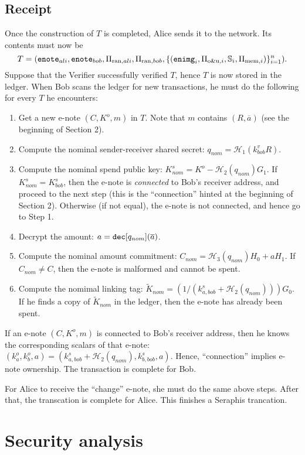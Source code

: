 \documentclass{article}
\begin{document}
\subsection{Receipt}
Once the construction of $T$ is completed, Alice sends it to the network. Its contents must now be
$$T=({\tt enote}_{ali}, {\tt enote}_{bob}, \Pi_{\text{ran}, ali}, \Pi_{\text{ran}, bob}, \{({\tt enimg}_i, \Pi_{\text{o\&u}, i}, \mathbb{S}_i, \Pi_{\text{mem}, i})\}_{i=1}^n).$$
\noindent Suppose that the Verifier successfully verified $T$, hence $T$ is now stored in the ledger. When Bob scans the ledger for new transactions, he must do the following for every $T$ he encounters:
\begin{enumerate}
    \item Get a new e-note $(C, K^o, m)$ in $T$. Note that $m$ contains $(R, \overline{a})$ (see the beginning of Section 2).
    \item Compute the nominal sender-receiver shared secret: $q_{nom} = \mathcal{H}_1(k_{bob}^v R)$.
    \item Compute the nominal spend public key: $K_{nom}^s = K^o - \mathcal{H}_2(q_{nom})G_1$. If $K_{nom}^s = K_{bob}^s$, then the e-note is \textit{connected} to Bob's receiver address, and proceed to the next step (this is the ``connection'' hinted at the beginning of Section 2).  Otherwise (if not equal), the e-note is not connected, and hence go to Step 1.
    \item Decrypt the amount: $a = {\tt dec}[q_{nom}](\overline a)$.
    \item Compute the nominal amount commitment: $C_{nom} = \mathcal{H}_3(q_{nom})H_0 + a H_1$. If $C_{nom} \ne C$, then the e-note is malformed and cannot be spent.
    \item Compute the nomimal linking tag: $\tilde{K}_{nom} = (1/(k_{a, bob}^s + \mathcal{H}_2(q_{nom})))G_0$. If he finds a copy of $\tilde{K}_{nom}$ in the ledger, then the e-note has already been spent.
\end{enumerate}
If an e-note $(C, K^o, m)$ is connected to Bob's receiver address, then he knows the corresponding scalars of that e-note: $(k_a^o, k_b^o, a) = (k_{a, bob}^s + \mathcal{H}_2(q_{nom}), k_{b, bob}^s, a)$. Hence, ``connection'' implies e-note ownership. The transaction is complete for Bob.

For Alice to receive the ``change'' e-note, she must do the same above steps. After that, the transcation is complete for Alice. This finishes a Seraphis trancation.

\section{Security analysis}
\end{document}
